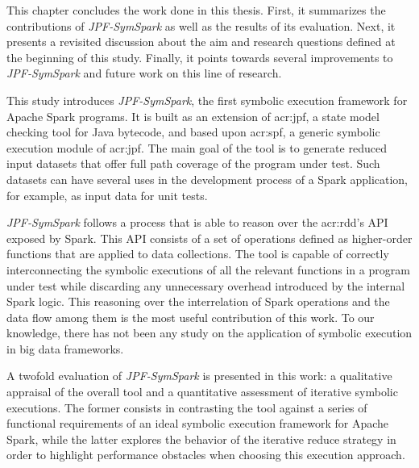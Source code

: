 
This chapter concludes the work done in this thesis. First, it summarizes the contributions of \textit{JPF-SymSpark} as well as the results of its evaluation. Next, it presents a revisited discussion about the aim and research questions defined at the beginning of this study. Finally, it points towards several improvements to \textit{JPF-SymSpark} and future work on this line of research.


This study introduces \textit{JPF-SymSpark}, the first symbolic execution framework for Apache Spark programs. It is built as an extension of \acrfull{acr:jpf}, a state model checking tool for Java bytecode, and based upon \acrfull{acr:spf}, a generic symbolic execution module of \acrshort{acr:jpf}. The main goal of the tool is to generate reduced input datasets that offer full path coverage of the program under test. Such datasets can have several uses in the development process of a Spark application, for example, as input data for unit tests. 

\textit{JPF-SymSpark} follows a process that is able to reason over the \acrshort{acr:rdd}'s API exposed by Spark. This API consists of a set of operations defined as higher-order functions that are applied to data collections. The tool is capable of correctly interconnecting the symbolic executions of all the relevant functions in a program under test while discarding any unnecessary overhead introduced by the internal Spark logic. This reasoning over the interrelation of Spark operations and the data flow among them is the most useful contribution of this work. To our knowledge, there has not been any study on the application of symbolic execution in big data frameworks.

A twofold evaluation of \textit{JPF-SymSpark} is presented in this work: a qualitative appraisal of the overall tool and a quantitative assessment of iterative symbolic executions. The former consists in contrasting the tool against a series of functional requirements of an ideal symbolic execution framework for Apache Spark, while the latter explores the behavior of the iterative reduce strategy in order to highlight performance obstacles when choosing this execution approach. 


